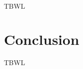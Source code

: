 \documentclass[conference,compsoc]{IEEEtran}
\begin{document}
TBWL





\section{Conclusion}
TBWL

\end{document}
